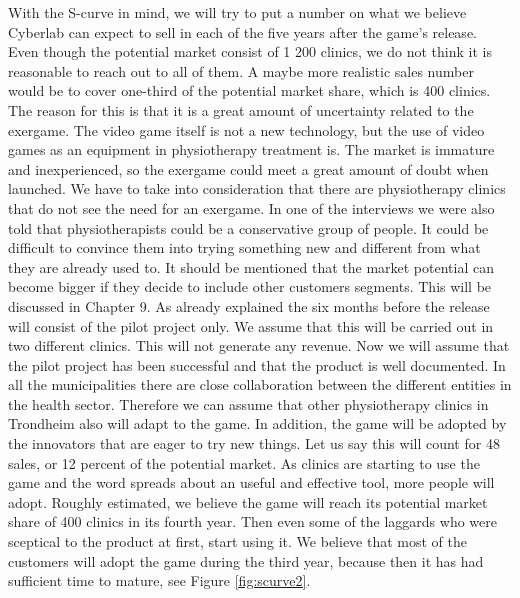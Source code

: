 With the S-curve in mind, we will try to put a number on what we believe Cyberlab can expect to sell in each of the five years after the game’s release. Even though the potential market consist of 1 200 clinics, we do not think it is reasonable to reach out to all of them. A maybe more realistic sales number would be to cover one-third of the potential market share, which is 400 clinics. The reason for this is that it is a great amount of uncertainty related to the exergame. The video game itself is not a new technology, but the use of video games as an equipment in physiotherapy treatment is. The market is immature and inexperienced, so the exergame could meet a great amount of doubt when launched. We have to take into consideration that there are physiotherapy clinics that do not see the need for an exergame. In one of the interviews we were also told that physiotherapists could be a conservative group of people. It could be difficult to convince them into trying something new and different from what they are already used to. It should be mentioned that the market potential can become bigger if they decide to include other customers segments. This will be discussed in Chapter 9. As already explained the six months before the release will consist of the pilot project only. We assume that this will be carried out in two different clinics. This will not generate any revenue. Now we will assume that the pilot project has been successful and that the product is well documented. In all the municipalities there are close collaboration between the different entities in the health sector. Therefore we can assume that other physiotherapy clinics in Trondheim also will adapt to the game. In addition, the game will be adopted by the innovators that are eager to try new things. Let us say this will count for 48 sales, or 12 percent of the potential market. As clinics are starting to use the game and the word spreads about an useful and effective tool, more people will adopt. Roughly estimated, we believe the game will reach its potential market share of 400 clinics in its fourth year. Then even some of the laggards who were sceptical to the product at first, start using it. We believe that most of the customers will adopt the game during the third year, because then it has had sufficient time to mature, see Figure \ref{fig:scurve2}. \\ \\ 
